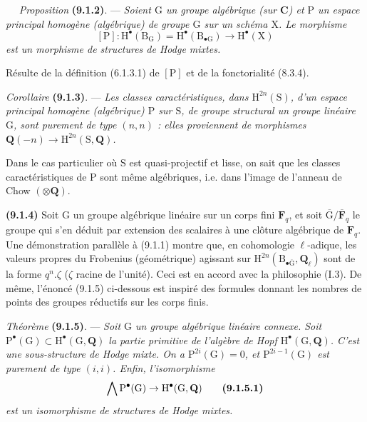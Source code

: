 \documentclass[11pt,leqno]{article}
\newcommand{\Page}[1]{\ifvmode\noindent\else\unskip\ \fi{\footnotesize\textcolor{gray}{[p.\,#1]}}\ \ignorespaces}
\begin{document}
\Page{46}
\textit{Proposition} \textbf{(9.1.2)}. — \textit{Soient \(\mathrm{G}\) un groupe algébrique (sur \(\mathbf{C}\)) et \(\mathrm{P}\) un espace principal homogène (algébrique) de groupe \(\mathrm{G}\) sur un schéma \(\mathrm{X}\). Le morphisme}
\[
[\mathrm{P}]:\mathrm{H}^{\bullet}(\mathrm{B}_{\mathrm{G}})
=\mathrm{H}^{\bullet}(\mathrm{B}_{\bullet\mathrm{G}})
\to\mathrm{H}^{\bullet}(\mathrm{X})
\]
\textit{est un morphisme de structures de Hodge mixtes.}

Résulte de la définition (6.1.3.1) de \([\mathrm{P}]\) et de la fonctorialité (8.3.4).

\textit{Corollaire} \textbf{(9.1.3)}. — \textit{Les classes caractéristiques, dans \(\mathrm{H}^{2n}(\mathrm{S})\), d’un espace principal homogène (algébrique) \(\mathrm{P}\) sur \(\mathrm{S}\), de groupe structural un groupe linéaire \(\mathrm{G}\), sont purement de type \((n,n)\) : elles proviennent de morphismes \(\mathbf{Q}(-n)\to\mathrm{H}^{2n}(\mathrm{S},\mathbf{Q})\).}

Dans le cas particulier où \(\mathrm{S}\) est quasi-projectif et lisse, on sait que les classes caractéristiques de \(\mathrm{P}\) sont même algébriques, i.e. dans l’image de l’anneau de Chow \((\otimes\mathbf{Q})\).

\textbf{(9.1.4)} Soit \(\mathrm{G}\) un groupe algébrique linéaire sur un corps fini \(\mathbf{F}_{q}\), et soit \(\overline{\mathrm{G}}/\overline{\mathbf{F}}_{q}\) le groupe qui s’en déduit par extension des scalaires à une clôture algébrique de \(\mathbf{F}_{q}\). Une démonstration parallèle à (9.1.1) montre que, en cohomologie \(\ell\)-adique, les valeurs propres du Frobenius (géométrique) agissant sur \(\mathrm{H}^{2n}(\mathrm{B}_{\bullet\overline{\mathrm{G}}},\mathbf{Q}_{\ell})\) sont de la forme \(q^{n}.\zeta\) (\(\zeta\) racine de l’unité). Ceci est en accord avec la philosophie (I.3). De même, l’énoncé (9.1.5) ci-dessous est inspiré des formules donnant les nombres de points des groupes réductifs sur les corps finis.

\textit{Théorème} \textbf{(9.1.5)}. — \textit{Soit \(\mathrm{G}\) un groupe algébrique linéaire connexe. Soit \(\mathrm{P}^{\bullet}(\mathrm{G})\subset\mathrm{H}^{\bullet}(\mathrm{G},\mathbf{Q})\) la partie primitive de l’algèbre de Hopf \(\mathrm{H}^{\bullet}(\mathrm{G},\mathbf{Q})\). C’est une sous-structure de Hodge mixte. On a \(\mathrm{P}^{2i}(\mathrm{G})=0\), et \(\mathrm{P}^{2i-1}(\mathrm{G})\) est purement de type \((i,i)\). Enfin, l’isomorphisme}
\[
\bigwedge\mathrm{P}^{\bullet}(\mathrm{G})
\to\mathrm{H}^{\bullet}(\mathrm{G},\mathbf{Q})
\tag*{\textbf{(9.1.5.1)}}
\]
\textit{est un isomorphisme de structures de Hodge mixtes.}
\end{document}
